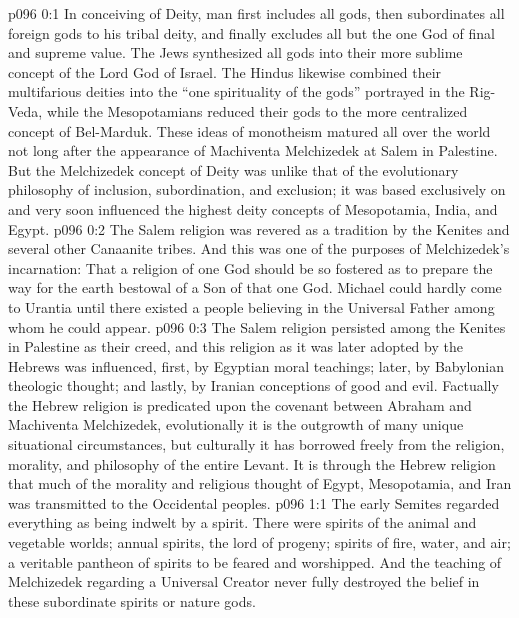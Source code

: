 \author{Melchizedek}
\vs p096 0:1 In conceiving of Deity, man first includes all gods, then subordinates all foreign gods to his tribal deity, and finally excludes all but the one God of final and supreme value. The Jews synthesized all gods into their more sublime concept of the Lord God of Israel. The Hindus likewise combined their multifarious deities into the “one spirituality of the gods” portrayed in the Rig\hyp{}Veda, while the Mesopotamians reduced their gods to the more centralized concept of Bel\hyp{}Marduk. These ideas of monotheism matured all over the world not long after the appearance of Machiventa Melchizedek at Salem in Palestine. But the Melchizedek concept of Deity was unlike that of the evolutionary philosophy of inclusion, subordination, and exclusion; it was based exclusively on  and very soon influenced the highest deity concepts of Mesopotamia, India, and Egypt.
\vs p096 0:2 \pc The Salem religion was revered as a tradition by the Kenites and several other Canaanite tribes. And this was one of the purposes of Melchizedek’s incarnation: That a religion of one God should be so fostered as to prepare the way for the earth bestowal of a Son of that one God. Michael could hardly come to Urantia until there existed a people believing in the Universal Father among whom he could appear.
\vs p096 0:3 The Salem religion persisted among the Kenites in Palestine as their creed, and this religion as it was later adopted by the Hebrews was influenced, first, by Egyptian moral teachings; later, by Babylonian theologic thought; and lastly, by Iranian conceptions of good and evil. Factually the Hebrew religion is predicated upon the covenant between Abraham and Machiventa Melchizedek, evolutionally it is the outgrowth of many unique situational circumstances, but culturally it has borrowed freely from the religion, morality, and philosophy of the entire Levant. It is through the Hebrew religion that much of the morality and religious thought of Egypt, Mesopotamia, and Iran was transmitted to the Occidental peoples.
\vs p096 1:1 The early Semites regarded everything as being indwelt by a spirit. There were spirits of the animal and vegetable worlds; annual spirits, the lord of progeny; spirits of fire, water, and air; a veritable pantheon of spirits to be feared and worshipped. And the teaching of Melchizedek regarding a Universal Creator never fully destroyed the belief in these subordinate spirits or nature gods.
